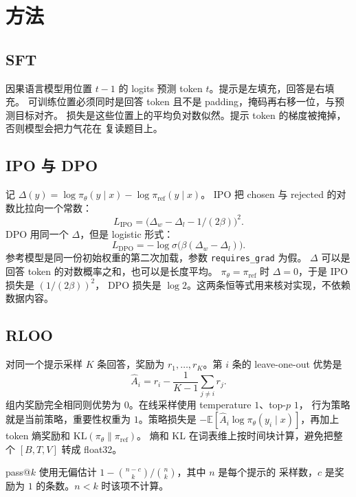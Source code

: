 \documentclass[10pt,twocolumn,a4paper]{ctexart}
\begin{document}
\section{方法}
\subsection{SFT}
因果语言模型用位置 $t-1$ 的 logits 预测 token $t$。提示是左填充，回答是右填充。
可训练位置必须同时是回答 token 且不是 padding，掩码再右移一位，与预测目标对齐。
损失是这些位置上的平均负对数似然。提示 token 的梯度被掩掉，否则模型会把力气花在
复读题目上。

\subsection{IPO 与 DPO}
记 $\Delta(y)=\log\pi_\theta(y\mid x)-\log\pi_{\mathrm{ref}}(y\mid x)$。
IPO 把 chosen 与 rejected 的对数比拉向一个常数\citep{azar2024ipo}：
\begin{equation}
L_{\mathrm{IPO}}=\bigl(\Delta_w-\Delta_l-1/(2\beta)\bigr)^2.
\end{equation}
DPO 用同一个 $\Delta$，但是 logistic 形式\citep{rafailov2023dpo}：
\begin{equation}
L_{\mathrm{DPO}}=-\log\sigma\bigl(\beta(\Delta_w-\Delta_l)\bigr).
\end{equation}
参考模型是同一份初始权重的第二次加载，参数 \texttt{requires\_grad} 为假。
$\Delta$ 可以是回答 token 的对数概率之和，也可以是长度平均。
$\pi_\theta=\pi_{\mathrm{ref}}$ 时 $\Delta=0$，于是 IPO 损失是 $(1/(2\beta))^2$，
DPO 损失是 $\log 2$。这两条恒等式用来核对实现，不依赖数据内容。

\subsection{RLOO}
对同一个提示采样 $K$ 条回答，奖励为 $r_1,\ldots,r_K$。第 $i$ 条的
leave-one-out 优势是\citep{kool2019buy,ahmadian2024rloo}
\begin{equation}
\hat A_i=r_i-\frac{1}{K-1}\sum_{j\neq i}r_j.
\end{equation}
组内奖励完全相同则优势为 $0$。在线采样使用 temperature $1$、top-$p$ $1$，
行为策略就是当前策略，重要性权重为 $1$。策略损失是
$-\mathbb{E}[\hat A_i\log\pi_\theta(y_i\mid x)]$，再加上 token 熵奖励和
$\mathrm{KL}(\pi_\theta\|\pi_{\mathrm{ref}})$\citep{williams1992reinforce,schulman2017ppo}。
熵和 KL 在词表维上按时间块计算，避免把整个 $[B,T,V]$ 转成 float32。

pass@$k$ 使用无偏估计 $1-\binom{n-c}{k}/\binom{n}{k}$，其中 $n$ 是每个提示的
采样数，$c$ 是奖励为 $1$ 的条数\citep{chen2021codex}。$n<k$ 时该项不计算。
\end{document}
